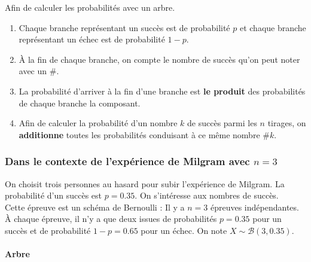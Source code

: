 \documentclass[paper=a4, fontsize=9pt]{scrartcl} %
\begin{document}
Afin de calculer les probabilités avec un arbre.
\begin{enumerate}
\item Chaque branche représentant un succès est de probabilité $p$ et chaque branche représentant un échec est de probabilité $1-p$.
\item À la fin de chaque branche, on compte le nombre de succès qu'on peut noter avec un \#.
\item La probabilité d'arriver à la fin d'une branche est \textbf{le produit} des probabilités de chaque branche la composant.
\item Afin de calculer la probabilité d'un nombre $k$ de succès parmi les $n$ tirages, on \textbf{additionne} toutes les probabilités conduisant à ce même nombre $\#k$.
\end{enumerate}

\subsubsection{Dans le contexte de l'expérience de Milgram avec $n=3$}

On choisit trois personnes au hasard pour subir l'expérience de Milgram. La probabilité d'un succès est $p = 0.35$. On s'intéresse aux nombres de succès.\\

Cette épreuve est un schéma de Bernoulli : Il y a $n = 3$ épreuves indépendantes. À chaque épreuve, il n'y a que deux issues de probabilités $p=0.35$ pour un succès et de probabilité $1-p = 0.65$ pour un échec. On note $X \sim \mathcal{B}(3,0.35)$. 

\paragraph{Arbre}~~\\

\end{document}
